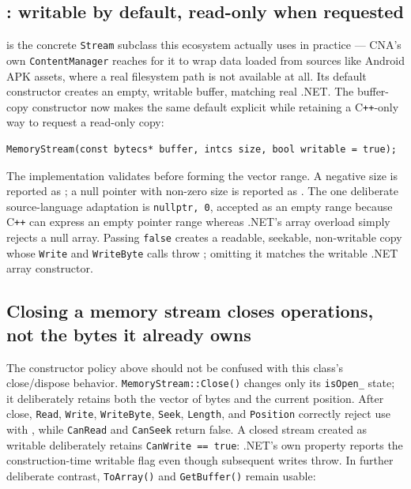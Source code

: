 \subsection{: writable by default, read-only when requested}

 is the concrete \texttt{Stream} subclass this ecosystem
actually uses in practice --- CNA's own \texttt{ContentManager} reaches for it to wrap data
loaded from sources like Android APK assets, where a real filesystem path is not available at
all. Its default constructor creates an empty, writable buffer, matching real .NET. The
buffer-copy constructor now makes the same default explicit while retaining a C\texttt{++}-only
way to request a read-only copy:

\begin{lstlisting}
MemoryStream(const bytecs* buffer, intcs size, bool writable = true);
\end{lstlisting}

The implementation validates before forming the vector range. A negative size is reported as
; a null pointer with non-zero size is reported as
. The one deliberate source-language adaptation is
\texttt{nullptr, 0}, accepted as an empty range because C\texttt{++} can express an empty pointer
range whereas .NET's array overload simply rejects a null array. Passing \texttt{false} creates
a readable, seekable, non-writable copy whose \texttt{Write} and \texttt{WriteByte} calls throw
; omitting it matches the writable .NET array constructor.

\subsection{Closing a memory stream closes operations, not the bytes it already owns}

The constructor policy above should not be confused with this class's close/dispose behavior.
\texttt{MemoryStream::Close()} changes only its
\texttt{isOpen\_} state; it deliberately retains both the vector of bytes and the current
position.  After close, \texttt{Read}, \texttt{Write}, \texttt{WriteByte}, \texttt{Seek},
\texttt{Length}, and \texttt{Position} correctly reject use with
, while \texttt{CanRead} and \texttt{CanSeek} return false.
A closed stream created as writable deliberately retains \texttt{CanWrite == true}: .NET's own
property reports the construction-time writable flag even though subsequent writes throw.
In further deliberate contrast, \texttt{ToArray()} and \texttt{GetBuffer()} remain usable:

